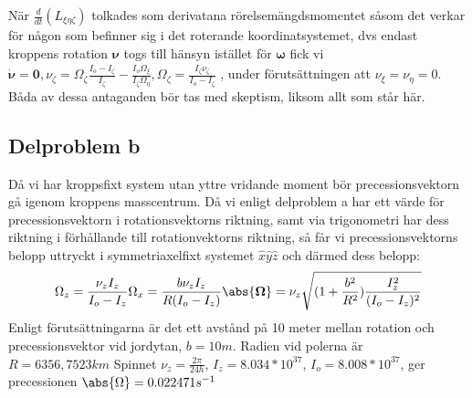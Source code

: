 \documentclass[12pt,a4paper]{article}
\begin{document}
När $\frac{d}{dt}(L_{\xi\eta\zeta})$ tolkades som derivatana rörelsemängdsmomentet såsom det verkar för någon som befinner sig i det roterande koordinatsystemet, dvs endast kroppens rotation $\boldsymbol{\nu}$ togs till hänsyn istället för $\boldsymbol{\omega}$ fick vi $\dot{\boldsymbol{\nu}} = \mathbf{0} , \nu_{\zeta} = \Omega_{\zeta}\frac{I_o-I_{\zeta}}{I_{\zeta}} - \frac{I_o \dot{\Omega}_{\xi}}{I_{\zeta} \Omega_{\eta}} , \Omega_{\zeta} = \frac{I_{\zeta} \nu_{\zeta}}{I_o-I_{\zeta}}$ , under förutsättningen att $\nu_{\xi}=\nu_{\eta}=0$. Båda av dessa antaganden bör tas med skeptism, liksom allt som står här.

\subsection{Delproblem b}
Då vi har kroppsfixt system utan yttre vridande moment bör precessionsvektorn gå igenom kroppens masscentrum.  Då vi enligt delproblem a har ett värde för precessionsvektorn i rotationsvektorns riktning, samt via trigonometri har dess riktning i förhållande till rotationvektorns riktning, så får vi precessionsvektorns belopp uttryckt i symmetriaxelfixt systemet $\hat{x}\hat{y}\hat{z}$ och därmed dess belopp:
\begin{equation*}
\Omega_z = \frac{\nu_z I_z}{I_o-I_z}
\Omega_x = \frac{b \nu_z I_z}{R(I_o-I_z)}
\abs{\boldsymbol{\Omega}}=\nu_z \sqrt{(1+\frac{b^2}{R^2})\frac{I_z^2}{(I_o-I_z)^2}} 
\end{equation*}
Enligt förutsättningarna är det ett avstånd på 10 meter mellan rotation och precessionsvektor vid jordytan, $b=10m$. Radien vid polerna är $R= 6356,7523 km$
Spinnet $\nu_z = \frac{2\pi}{24h}$, $I_z=8.034*10^{37}$, $I_o=8.008*10^{37}$, ger precessionen $\abs{\Omega} = 0.022471 s^{-1}$
\end{document}
